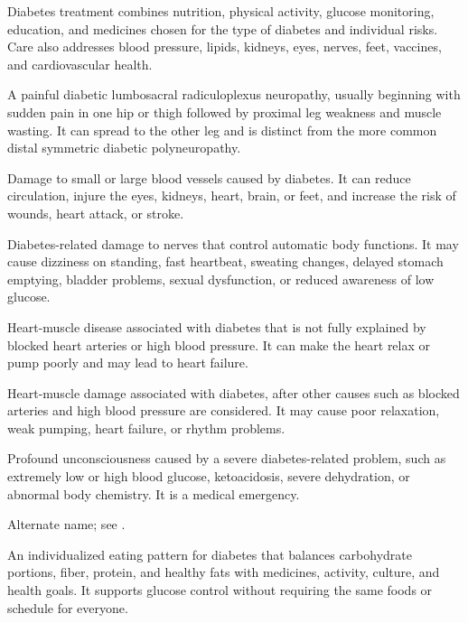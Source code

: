  Diabetes treatment combines nutrition, physical activity, glucose monitoring, education, and medicines chosen for the type of diabetes and individual risks. Care also addresses blood pressure, lipids, kidneys, eyes, nerves, feet, vaccines, and cardiovascular health.

 A painful diabetic lumbosacral radiculoplexus neuropathy, usually beginning
with sudden pain in one hip or thigh followed by proximal leg weakness and muscle wasting.
It can spread to the other leg and is distinct from the more common distal symmetric
diabetic polyneuropathy.

 Damage to small or large blood vessels caused by diabetes. It can reduce circulation, injure the eyes, kidneys, heart, brain, or feet, and increase the risk of wounds, heart attack, or stroke.

 Diabetes-related damage to nerves that control automatic body functions. It may cause dizziness on standing, fast heartbeat, sweating changes, delayed stomach emptying, bladder problems, sexual dysfunction, or reduced awareness of low glucose.

 Heart-muscle disease associated with diabetes that is not fully explained by blocked heart arteries or high blood pressure. It can make the heart relax or pump poorly and may lead to heart failure.

 Heart-muscle damage associated with diabetes, after other causes such as blocked arteries and high blood pressure are considered. It may cause poor relaxation, weak pumping, heart failure, or rhythm problems.

 Profound unconsciousness caused by a severe diabetes-related problem, such as extremely low or high blood glucose, ketoacidosis, severe dehydration, or abnormal body chemistry. It is a medical emergency.

 Alternate name; see .


 An individualized eating pattern for diabetes that balances carbohydrate portions, fiber, protein, and healthy fats with medicines, activity, culture, and health goals. It supports glucose control without requiring the same foods or schedule for everyone.

